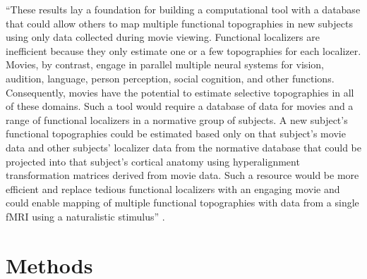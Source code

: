 %
``These results lay a foundation for building a computational tool with a
database that could allow others to map multiple functional topographies in new
subjects using only data collected during movie viewing. Functional localizers
are inefficient because they only estimate one or a few topographies for each
localizer. Movies, by contrast, engage in parallel multiple neural systems for
vision, audition, language, person perception, social cognition, and other
functions. Consequently, movies have the potential to estimate selective
topographies in all of these domains. Such a tool would require a database of
data for movies and a range of functional localizers in a normative group of
subjects. A new subject's functional topographies could be estimated based only
on that subject's movie data and other subjects’ localizer data from the
normative database that could be projected into that subject’s cortical anatomy
using hyperalignment transformation matrices derived from movie data. Such a
resource would be more efficient and replace tedious functional localizers with
an engaging movie and could enable mapping of multiple functional topographies
with data from a single fMRI using a naturalistic stimulus''
\citep{jiahui2020predicting}.


\section{Methods}






